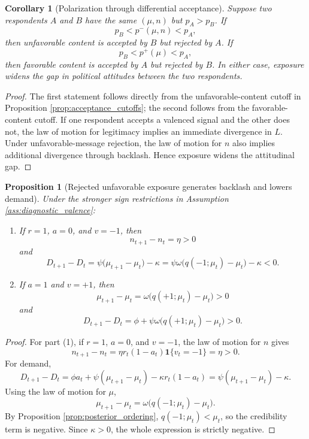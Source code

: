 \documentclass[12pt,american]{article}
\newtheorem{proposition}{Proposition}
\newtheorem{corollary}{Corollary}
\begin{document}
\begin{refsection}
		\begin{corollary}[Polarization through differential acceptance]
			\label{cor:polarization}
			Suppose two respondents \(A\) and \(B\) have the same \((\mu,n)\) but \(p_A>p_B\). If
			\[
			p_B<p^-(\mu,n)<p_A,
			\]
			then unfavorable content is accepted by \(B\) but rejected by \(A\). If
			\[
			p_B<p^+(\mu)<p_A,
			\]
			then favorable content is accepted by \(A\) but rejected by \(B\). In either case, exposure widens the gap in political attitudes between the two respondents.
		\end{corollary}
		
		\begin{proof}
				The first statement follows directly from the unfavorable-content cutoff in Proposition \ref{prop:acceptance_cutoffs}; the second follows from the favorable-content cutoff. If one respondent accepts a valenced signal and the other does not, the law of motion for legitimacy implies an immediate divergence in \(L\). Under unfavorable-message rejection, the law of motion for \(n\) also implies additional divergence through backlash. Hence exposure widens the attitudinal gap.
		\end{proof}
		
		\begin{proposition}[Rejected unfavorable exposure generates backlash and lowers demand]
			\label{prop:backlash_demand}
			Under the stronger sign restrictions in Assumption \ref{ass:diagnostic_valence}:
			
			\begin{enumerate}
				\item If \(r=1\), \(a=0\), and \(v=-1\), then
				\[
				n_{t+1}-n_t=\eta>0
				\]
				and
				\[
				D_{t+1}-D_t
				=
				\psi\big(\mu_{t+1}-\mu_t\big)-\kappa
				=
				\psi\omega\big(q(-1;\mu_t)-\mu_t\big)-\kappa<0.
				\]
				
				\item If \(a=1\) and \(v=+1\), then
				\[
				\mu_{t+1}-\mu_t=\omega\big(q(+1;\mu_t)-\mu_t\big)>0
				\]
				and
				\[
				D_{t+1}-D_t
				=
				\phi+\psi\omega\big(q(+1;\mu_t)-\mu_t\big)>0.
				\]
			\end{enumerate}
		\end{proposition}
		
		\begin{proof}
			For part (1), if \(r=1\), \(a=0\), and \(v=-1\), the law of motion for \(n\) gives
			\[
			n_{t+1}-n_t=\eta r_t(1-a_t)\mathbf{1}\{v_t=-1\}=\eta>0.
			\]
			For demand,
			\[
			D_{t+1}-D_t
			=
			\phi a_t+\psi(\mu_{t+1}-\mu_t)-\kappa r_t(1-a_t)
			=
			\psi(\mu_{t+1}-\mu_t)-\kappa.
			\]
			Using the law of motion for \(\mu\),
			\[
			\mu_{t+1}-\mu_t
			=
			\omega\big(q(-1;\mu_t)-\mu_t\big).
			\]
			By Proposition \ref{prop:posterior_ordering}, \(q(-1;\mu_t)<\mu_t\), so the credibility term is negative. Since \(\kappa>0\), the whole expression is strictly negative.
			

\end{proof}
\end{refsection}
\end{document}
